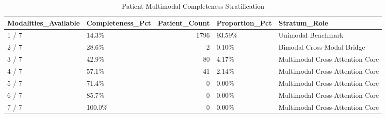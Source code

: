 \begin{table}
\caption{Patient Multimodal Completeness Stratification}
\label{tab:table_patient_completeness}
\begin{tabular}{llrll}
\toprule
Modalities\_Available & Completeness\_Pct & Patient\_Count & Proportion\_Pct & Stratum\_Role \\
\midrule
1 / 7 & 14.3\% & 1796 & 93.59\% & Unimodal Benchmark \\
2 / 7 & 28.6\% & 2 & 0.10\% & Bimodal Cross-Modal Bridge \\
3 / 7 & 42.9\% & 80 & 4.17\% & Multimodal Cross-Attention Core \\
4 / 7 & 57.1\% & 41 & 2.14\% & Multimodal Cross-Attention Core \\
5 / 7 & 71.4\% & 0 & 0.00\% & Multimodal Cross-Attention Core \\
6 / 7 & 85.7\% & 0 & 0.00\% & Multimodal Cross-Attention Core \\
7 / 7 & 100.0\% & 0 & 0.00\% & Multimodal Cross-Attention Core \\
\bottomrule
\end{tabular}
\end{table}
